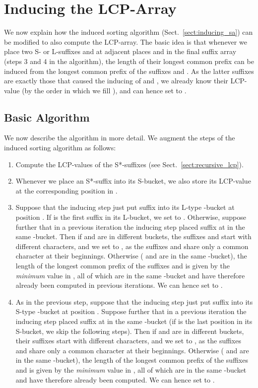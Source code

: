 \documentclass[11pt,onecolumn,final]{article} \usepackage[latin1]{inputenc}
\theoremstyle{plain}
\theoremstyle{remark}
\begin{document}
\section{Inducing the LCP-Array}
\label{sect:inducing_lcp}
We now explain how the induced sorting algorithm (Sect.~\ref{sect:inducing_sa}) can be modified to also compute the LCP-array. The basic idea is that whenever we place two S- or L-suffixes  and  at adjacent places  and  in the final suffix array (steps 3 and 4 in the algorithm), the length of their longest common prefix can be induced from the longest common prefix of the suffixes  and . As the latter suffixes are exactly those that caused the inducing of  and , we already know their LCP-value  (by the order in which we fill ), and can hence set  to .

\subsection{Basic Algorithm}
We now describe the algorithm in more detail. We augment the steps of the induced sorting algorithm as follows:

\begin{enumerate}[1.]
\item Compute the LCP-values of the S*-suffixes (see Sect.~\ref{sect:recursive_lcp}).
\item Whenever we place an S*-suffix into its S-bucket, we also store its LCP-value at the corresponding position in .
\item Suppose that the inducing step just put suffix  into its L-type -bucket at position . If  is the first suffix in its L-bucket, we set  to . Otherwise, suppose further that in a previous iteration  the inducing step placed suffix  at  in the same -bucket. Then if  and  are in different buckets, the suffixes  and  start with different characters, and we set  to , as the suffixes  and  share only a common character  at their beginnings. Otherwise ( and  are in the same -bucket), the length  of the longest common prefix of the suffixes  and  is given by the \emph{minimum} value in , all of which are in the same -bucket and have therefore already been computed in previous iterations. We can hence set  to . 
\item As in the previous step, suppose that the inducing step just put suffix  into its S-type -bucket at position . Suppose further that in a previous iteration  the inducing step placed suffix  at  in the same -bucket (if  is the last position in its S-bucket, we skip the following steps). Then if  and  are in different buckets, their suffixes start with different characters, and we set  to , as the suffixes  and  share only a common character  at their beginnings. Otherwise ( and  are in the same -bucket), the length  of the longest common prefix of the suffixes  and  is given by the \emph{minimum} value in , all of which are in the same -bucket and have therefore already been computed. We can hence set  to . 
\end{enumerate}
\end{document}
